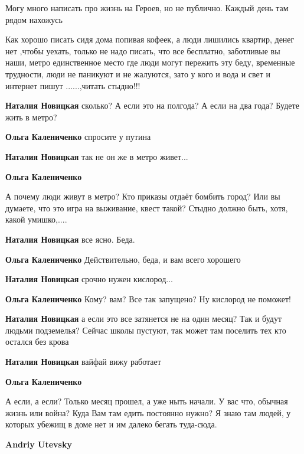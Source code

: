 \begin{itemize}

Могу много написать про жизнь на Героев, но не публично. Каждый день там рядом
нахожусь


Как хорошо писать сидя дома попивая кофеек, а люди лишились квартир, денег нет
,чтобы уехать, только не надо писать, что все бесплатно, заботливые вы наши, метро
единственное место где люди могут пережить эту беду, временные трудности, люди не
паникуют и не жалуются, зато у кого и вода и свет и интернет пишут ......,читать
стыдно!!!

\begin{itemize} %
\textbf{Наталия Новицкая} сколько? А если это на полгода? А если на два года? Будете жить в метро?

\textbf{Ольга Калениченко} спросите у путина

\textbf{Наталия Новицкая} так не он же в метро живет...

\textbf{Ольга Калениченко} 

А почему люди живут в метро? Кто приказы отдаёт бомбить город? Или вы
думаете, что это игра на выживание, квест такой? Стыдно должно быть, хотя, какой
умишко,....

\textbf{Наталия Новицкая} все ясно. Беда.

\textbf{Ольга Калениченко} Действительно, беда, и вам всего хорошего

\textbf{Наталия Новицкая} срочно нужен кислород...

\textbf{Ольга Калениченко} Кому? вам? Все так запущено? Ну кислород не поможет!

\textbf{Наталия Новицкая} а если это все затянется не на один месяц? Так и будут людьми подземелья? Сейчас школы пустуют, так может там поселить тех кто остался без крова

\textbf{Наталия Новицкая} вайфай вижу работает

\textbf{Ольга Калениченко} 

А если, а если? Только месяц прошел, а уже ныть начали. У вас что, обычная
жизнь или война? Куда Вам там едить постоянно нужно? Я знаю там людей, у
которых убежищ в доме нет и им далеко бегать туда-сюда.

\textbf{Andriy Utevsky} 


\end{itemize}
\end{itemize}
